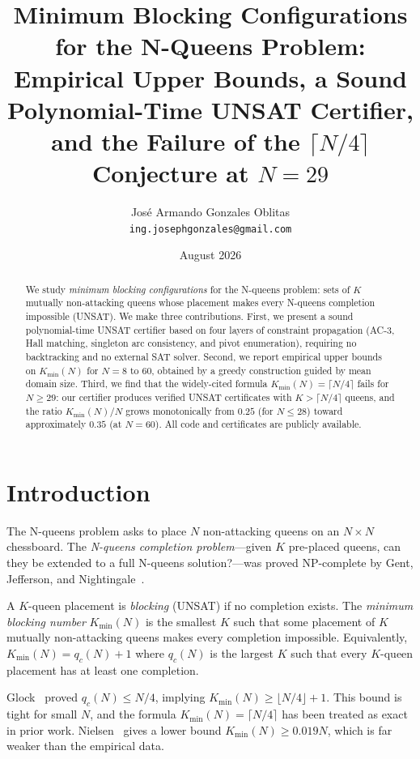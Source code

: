 \documentclass[11pt]{article}
\title{Minimum Blocking Configurations for the N-Queens Problem:\\
       Empirical Upper Bounds, a Sound Polynomial-Time UNSAT Certifier,\\
       and the Failure of the $\lceil N/4 \rceil$ Conjecture at $N=29$}
\author{Jos\'e Armando Gonzales Oblitas\\
\small{\texttt{ing.josephgonzales@gmail.com}}}
\date{August 2026}
\begin{document}
\maketitle

\begin{abstract}
We study \emph{minimum blocking configurations} for the N-queens problem:
sets of $K$ mutually non-attacking queens whose placement makes every
N-queens completion impossible (UNSAT).
We make three contributions.
First, we present a sound polynomial-time UNSAT certifier based on four
layers of constraint propagation (AC-3, Hall matching, singleton arc
consistency, and pivot enumeration), requiring no backtracking and no
external SAT solver.
Second, we report empirical upper bounds on $K_{\min}(N)$ for $N = 8$
to $60$, obtained by a greedy construction guided by mean domain size.
Third, we find that the widely-cited formula $K_{\min}(N) = \lceil N/4 \rceil$
fails for $N \geq 29$: our certifier produces verified UNSAT certificates
with $K > \lceil N/4 \rceil$ queens, and the ratio $K_{\min}(N)/N$ grows
monotonically from $0.25$ (for $N \leq 28$) toward approximately $0.35$
(at $N = 60$).
All code and certificates are publicly available.
\end{abstract}

\section{Introduction}

The N-queens problem asks to place $N$ non-attacking queens on an $N \times N$
chessboard.
The \emph{N-queens completion problem}---given $K$ pre-placed queens, can they
be extended to a full N-queens solution?---was proved NP-complete by
Gent, Jefferson, and Nightingale~\cite{gent2017}.

A $K$-queen placement is \emph{blocking} (UNSAT) if no completion exists.
The \emph{minimum blocking number} $K_{\min}(N)$ is the smallest $K$ such
that some placement of $K$ mutually non-attacking queens makes every
completion impossible.
Equivalently, $K_{\min}(N) = q_c(N) + 1$ where $q_c(N)$ is the largest $K$
such that every $K$-queen placement has at least one completion.

Glock~\cite{glock2022} proved $q_c(N) \leq N/4$, implying
$K_{\min}(N) \geq \lfloor N/4 \rfloor + 1$.
This bound is tight for small $N$, and the formula
$K_{\min}(N) = \lceil N/4 \rceil$ has been treated as exact in prior work.
Nielsen~\cite{nielsen2026} gives a lower bound $K_{\min}(N) \geq 0.019N$,
which is far weaker than the empirical data.
\end{document}
